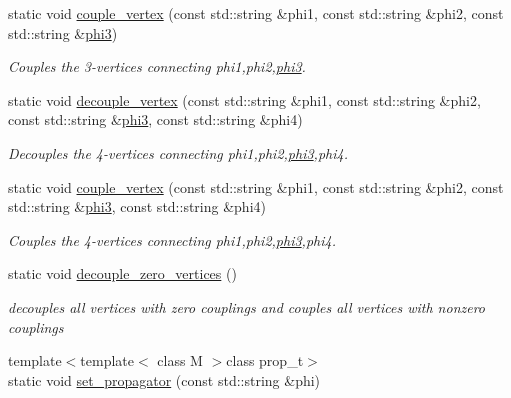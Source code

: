 \begin{DoxyCompactItemize}
static void \hyperlink{a00370_a1ada7c0d83308877cd41c28cf1c89be0}{couple\-\_\-vertex} (const std\-::string \&phi1, const std\-::string \&phi2, const std\-::string \&\hyperlink{a00418}{phi3})
\begin{DoxyCompactList}\small\item\em Couples the 3-\/vertices connecting phi1,phi2,\hyperlink{a00418}{phi3}. \end{DoxyCompactList}\item 
\hypertarget{a00370_a01e88fa34516f9679d742f11856f4611}{static void \hyperlink{a00370_a01e88fa34516f9679d742f11856f4611}{decouple\-\_\-vertex} (const std\-::string \&phi1, const std\-::string \&phi2, const std\-::string \&\hyperlink{a00418}{phi3}, const std\-::string \&phi4)}\label{a00370_a01e88fa34516f9679d742f11856f4611}

\begin{DoxyCompactList}\small\item\em Decouples the 4-\/vertices connecting phi1,phi2,\hyperlink{a00418}{phi3},phi4. \end{DoxyCompactList}\item 
\hypertarget{a00370_a16c864670deb6e9310aa27712dcbdd2c}{static void \hyperlink{a00370_a16c864670deb6e9310aa27712dcbdd2c}{couple\-\_\-vertex} (const std\-::string \&phi1, const std\-::string \&phi2, const std\-::string \&\hyperlink{a00418}{phi3}, const std\-::string \&phi4)}\label{a00370_a16c864670deb6e9310aa27712dcbdd2c}

\begin{DoxyCompactList}\small\item\em Couples the 4-\/vertices connecting phi1,phi2,\hyperlink{a00418}{phi3},phi4. \end{DoxyCompactList}\item 
\hypertarget{a00370_a7f0de2091dea1d3ec92df7456a769e9d}{static void \hyperlink{a00370_a7f0de2091dea1d3ec92df7456a769e9d}{decouple\-\_\-zero\-\_\-vertices} ()}\label{a00370_a7f0de2091dea1d3ec92df7456a769e9d}

\begin{DoxyCompactList}\small\item\em decouples all vertices with zero couplings and couples all vertices with nonzero couplings \end{DoxyCompactList}\item 
\hypertarget{a00370_ac08c09a5b298e2d3abd5beb11ef94701}{{\footnotesize template$<$template$<$ class M $>$class prop\-\_\-t$>$ }\\static void \hyperlink{a00370_ac08c09a5b298e2d3abd5beb11ef94701}{set\-\_\-propagator} (const std\-::string \&phi)}\label{a00370_ac08c09a5b298e2d3abd5beb11ef94701}


\end{DoxyCompactItemize}
